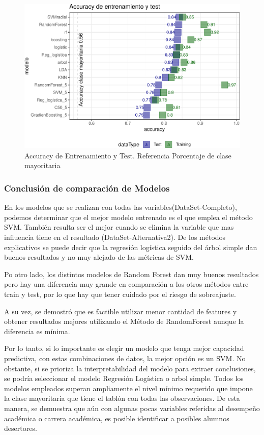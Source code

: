 \begin{figure}[!htb]
	\centering
	\includegraphics{imagenes/comparativo_modelos/unnamed-chunk-10-1.pdf}
	\caption{Accuracy de Entrenamiento y Test. Referencia Porcentaje de clase mayoritaria}
	\label{fig:comparativo_modelos}
\end{figure}


\subsubsection{Conclusión de comparación de Modelos}

En los modelos que se realizan con todas las variables(DataSet-Completo), podemos determinar
que el mejor modelo entrenado es el que emplea el método SVM. También
resulta ser el mejor cuando se elimina la variable que mas influencia
tiene en el resultado (DataSet-Alternativa2). De los métodos explicativos se puede decir que la
regresión logística seguido del árbol simple dan buenos resultados y no
muy alejado de las métricas de SVM.

Po otro lado, los distintos modelos de Random Forest dan muy buenos
resultados pero hay una diferencia muy grande en comparación a los otros
métodos entre train y test, por lo que hay que tener cuidado por el
riesgo de sobreajuste.

A su vez, se demostró que es factible utilizar menor cantidad de features y obtener resultados mejores utilizando el Método de RandomForest aunque la diferencia es mínima.

Por lo tanto, si lo importante es elegir un modelo que tenga mejor
capacidad predictiva, con estas combinaciones de datos, la mejor opción
es un SVM. No obstante, si se prioriza la interpretabilidad del modelo
para extraer conclusiones, se podría seleccionar el modelo Regresión
Logística o arbol simple.
Todos los modelos empleados superan ampliamente el nivel mínimo requerido que impone la clase mayoritaria que tiene el tablón con todas las observaciones. De esta manera, se demuestra que aún con algunas pocas variables referidas al desempeño académica o carrera académica, es posible identificar a posibles alumnos desertores.